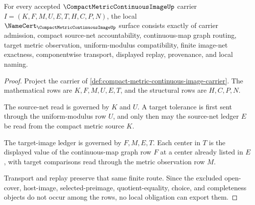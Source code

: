 \begin{theorem}
\label{thm:compact-metric-continuous-image-namecert-obligations}
For every accepted $\CompactMetricContinuousImageUp$ carrier $I=(K,F,M,U,E,T,H,C,P,N)$, the local $\NameCert_{\CompactMetricContinuousImageUp}$ surface consists exactly of carrier admission, compact source-net accountability, continuous-map graph routing, target metric observation, uniform-modulus compatibility, finite image-net exactness, componentwise transport, displayed replay, provenance, and local naming.
\end{theorem}
\begin{proof}
Project the carrier of \autoref{def:compact-metric-continuous-image-carrier}. The mathematical rows are $K,F,M,U,E,T$, and the structural rows are $H,C,P,N$.

The source-net read is governed by $K$ and $U$. A target tolerance is first sent through the uniform-modulus row $U$, and only then may the source-net ledger $E$ be read from the compact metric source $K$.

The target-image ledger is governed by $F,M,E,T$. Each center in $T$ is the displayed value of the continuous-map graph row $F$ at a center already listed in $E$, with target comparisons read through the metric observation row $M$.

Transport and replay preserve that same finite route. Since the excluded open-cover, host-image, selected-preimage, quotient-equality, choice, and completeness objects do not occur among the rows, no local obligation can export them.
\end{proof}

